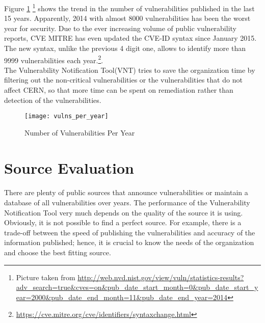 Figure \ref{figure:vulns_per_year}
\footnote{Picture taken from \url{http://web.nvd.nist.gov/view/vuln/statistics-results?adv_search=true&cves=on&pub_date_start_month=0&pub_date_start_year=2000&pub_date_end_month=11&pub_date_end_year=2014}} shows the trend in the number of vulnerabilities published in the last 15 years. Apparently, 2014 with almost 8000 vulnerabilities has been the worst year for security. Due to the ever increasing volume of public vulnerability reports, CVE MITRE has even updated the CVE-ID syntax since January 2015. The new syntax, unlike the previous 4 digit one, allows to identify more than 9999 vulnerabilities each year.\footnote{\url {https://cve.mitre.org/cve/identifiers/syntaxchange.html}}. 
\\
The Vulnerability Notification Tool(VNT) tries to save the organization time by filtering out the non-critical vulnerabilities or the vulnerabilities that do not affect CERN, so that more time can be spent on remediation rather than detection of the vulnerabilities.


\begin{figure}[h!]
\label{figure:vulns_per_year}
  \centering
    \texttt{[image: vulns\_per\_year]}
  \caption{Number of Vulnerabilities Per Year}
  
\end{figure}

%

\section{Source Evaluation}
\paragraph{}
There are plenty of public sources that announce vulnerabilities or maintain a database of all vulnerabilities over years. The performance of the Vulnerability Notification Tool very much depends on the quality of the source it is using. Obviously, it is not possible to find a perfect source. For example, there is a trade-off between the speed of publishing the vulnerabilities and accuracy of the information published; hence, it is crucial to know the needs of the organization and choose the best fitting source.

